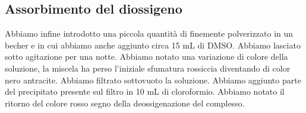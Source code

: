 \subsection{Assorbimento del diossigeno}\label{subsec:ossigeno}
Abbiamo infine introdotto una piccola quantità di  finemente polverizzato in un becher e in cui abbiamo anche aggiunto circa 15 mL di DMSO. Abbiamo lasciato sotto agitazione per una notte. Abbiamo notato una variazione di colore della soluzione, la miscela ha perso l'iniziale sfumatura rossiccia diventando di color nero antracite. Abbiamo filtrato sottovuoto la soluzione. Abbiamo aggiunto parte del precipitato presente sul filtro in 10 mL di cloroformio. Abbiamo notato il ritorno del colore rosso segno della deossigenazione del complesso.

